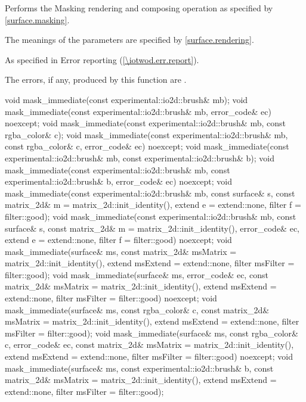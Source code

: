 \begin{itemdescr}
\pnum
\effects
Performs the Masking rendering and composing operation as specified by \ref{surface.masking}.

\pnum
The meanings of the parameters are specified by \ref{surface.rendering}.

\pnum
\throws
As specified in Error reporting (\ref{\iotwod.err.report}).

\pnum
\errors
The errors, if any, produced by this function are .
\end{itemdescr}

\begin{itemdecl}
void mask_immediate(const experimental::io2d::brush& mb);
  void mask_immediate(const experimental::io2d::brush& mb, 
  error_code& ec) noexcept;
void mask_immediate(const experimental::io2d::brush& mb,
  const rgba_color& c);
void mask_immediate(const experimental::io2d::brush& mb,
  const rgba_color& c, error_code& ec) noexcept;
void mask_immediate(const experimental::io2d::brush& mb,
  const experimental::io2d::brush& b);
void mask_immediate(const experimental::io2d::brush& mb,
  const experimental::io2d::brush& b, error_code& ec) noexcept;
void mask_immediate(const experimental::io2d::brush& mb, const surface& s, 
  const matrix_2d& m = matrix_2d::init_identity(), extend e = extend::none, 
  filter f = filter::good);
void mask_immediate(const experimental::io2d::brush& mb, const surface& s,
  const matrix_2d& m = matrix_2d::init_identity(), error_code& ec,
  extend e = extend::none, filter f = filter::good) noexcept;
void mask_immediate(surface& ms,
  const matrix_2d& msMatrix = matrix_2d::init_identity(),
  extend msExtend = extend::none, filter msFilter = filter::good);
void mask_immediate(surface& ms, error_code& ec, 
  const matrix_2d& msMatrix = matrix_2d::init_identity(),
  extend msExtend = extend::none, filter msFilter = filter::good) noexcept;
void mask_immediate(surface& ms, const rgba_color& c, 
  const matrix_2d& msMatrix = matrix_2d::init_identity(),
  extend msExtend = extend::none, filter msFilter = filter::good);
void mask_immediate(surface& ms, const rgba_color& c, error_code& ec, 
  const matrix_2d& msMatrix = matrix_2d::init_identity(),
  extend msExtend = extend::none, filter msFilter = filter::good) noexcept;
void mask_immediate(surface& ms, const experimental::io2d::brush& b, 
  const matrix_2d& msMatrix = matrix_2d::init_identity(),
  extend msExtend = extend::none, filter msFilter = filter::good);

\end{itemdecl}
